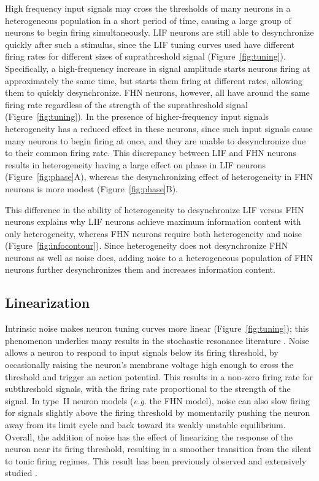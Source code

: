 \documentclass[letterpaper,11pt]{article}
\begin{document}
High frequency input signals may cross the thresholds of many neurons
in a heterogeneous population in a short period of time,
causing a large group of neurons to begin firing simultaneously.
LIF neurons are still able to desynchronize quickly after such a stimulus,
since the LIF tuning curves used have different firing rates
for different sizes of suprathreshold signal (Figure~\ref{fig:tuning}).
Specifically, a high-frequency increase in signal amplitude
starts neurons firing at approximately the same time,
but starts them firing at different rates,
allowing them to quickly desynchronize.
FHN neurons, however, all have around the same firing rate
regardless of the strength
of the suprathreshold signal (Figure~\ref{fig:tuning}).
In the presence of higher-frequency input signals
heterogeneity has a reduced effect in these neurons,
since such input signals cause many neurons to begin firing at once,
and they are unable to desynchronize due to their common firing rate.
This discrepancy between LIF and FHN neurons results in heterogeneity
having a large effect on phase in LIF neurons (Figure~\ref{fig:phase}A),
whereas the desynchronizing effect of heterogeneity
in FHN neurons is more modest (Figure~\ref{fig:phase}B).

This difference in the ability of heterogeneity to desynchronize LIF versus FHN neurons
explains why LIF neurons achieve maximum information content with only heterogeneity,
whereas FHN neurons require both heterogeneity and noise (Figure~\ref{fig:infocontour}).
Since heterogeneity does not desynchronize FHN neurons as well as noise does,
adding noise to a heterogeneous population of FHN neurons further desynchronizes them
and increases information content.

\subsection{Linearization}

Intrinsic noise makes neuron tuning curves more linear
(Figure~\ref{fig:tuning});
this phenomenon underlies many results in the stochastic resonance literature
\citep{Chialvo1997}.
Noise allows a neuron to respond to input signals below its firing threshold,
by occasionally raising the neuron's membrane voltage high enough
to cross the threshold and trigger an action potential.
This results in a non-zero firing rate for subthreshold signals,
with the firing rate proportional to the strength of the signal.
In type~II neuron models (\emph{e.g.} the FHN model),
noise can also slow firing for signals slightly above the firing threshold
by momentarily pushing the neuron away from its limit cycle
and back toward its weakly unstable equilibrium.
Overall, the addition of noise has the effect
of linearizing the response of the neuron near its firing threshold,
resulting in a smoother transition from the silent to tonic firing regimes.
This result has been previously observed and extensively studied \citep{Stocks1996,Chialvo1997,Chance2002,Prescott2002,Shu2003}.
\end{document}
